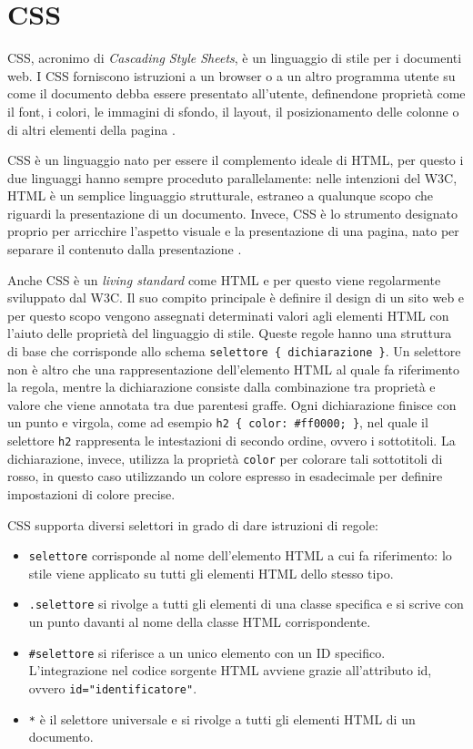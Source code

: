 \section{CSS}
CSS, acronimo di \textit{Cascading Style Sheets}, è un linguaggio di stile per i documenti web. I CSS forniscono istruzioni a un browser o a un altro programma utente su come il documento debba essere presentato all'utente, definendone proprietà come il font, i colori, le immagini di sfondo, il layout, il posizionamento delle colonne o di altri elementi della pagina \cite{CSS_Introduzione, CSS_Mozilla}.

CSS è un linguaggio nato per essere il complemento ideale di HTML, per questo i due linguaggi hanno sempre proceduto parallelamente: nelle intenzioni del W3C, HTML è un semplice linguaggio strutturale, estraneo a qualunque scopo che riguardi la presentazione di un documento. Invece, CSS è lo strumento designato proprio per arricchire l'aspetto visuale e la presentazione di una pagina, nato per separare il contenuto dalla presentazione \cite{CSS_Introduzione}.

Anche CSS è un \textit{living standard} come HTML e per questo viene regolarmente sviluppato dal W3C. Il suo compito principale è definire il design di un sito web e per questo scopo vengono assegnati determinati valori agli elementi HTML con l'aiuto delle proprietà del linguaggio di stile. Queste regole hanno una struttura di base che corrisponde allo schema \Verb_selettore { dichiarazione }_. Un selettore non è altro che una rappresentazione dell'elemento HTML al quale fa riferimento la regola, mentre la dichiarazione consiste dalla combinazione tra proprietà e valore che viene annotata tra due parentesi graffe. Ogni dichiarazione finisce con un punto e virgola, come ad esempio \Verb_h2 { color: #ff0000; }_, nel quale il selettore \Verb_h2_ rappresenta le intestazioni di secondo ordine, ovvero i sottotitoli. La dichiarazione, invece, utilizza la proprietà \Verb_color_ per colorare tali sottotitoli di rosso, in questo caso utilizzando un colore espresso in esadecimale per definire impostazioni di colore precise.

CSS supporta diversi selettori in grado di dare istruzioni di regole:
\begin{itemize}
    \item \Verb_selettore_ corrisponde al nome dell'elemento HTML a cui fa riferimento: lo stile viene applicato su tutti gli elementi HTML dello stesso tipo.
    \item \Verb_.selettore_ si rivolge a tutti gli elementi di una classe specifica e si scrive con un punto davanti al nome della classe HTML corrispondente.
    \item \Verb_#selettore_ si riferisce a un unico elemento con un ID specifico. L'integrazione nel codice sorgente HTML avviene grazie all'attributo id, ovvero \Verb_id="identificatore"_.
    \item \Verb_*_ è il selettore universale e si rivolge a tutti gli elementi HTML di un documento.
\end{itemize}

